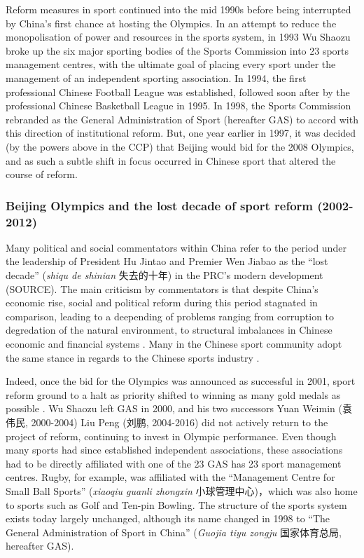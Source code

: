 {Reform measures in sport continued into the mid 1990s before being interrupted by China's first chance at hosting the Olympics.  In an attempt to reduce the monopolisation of power and resources in the sports system, in 1993 Wu Shaozu broke up the six major sporting bodies of the Sports Commission into 23 sports management centres, with the ultimate goal of placing every sport under the management of an independent sporting association.  In 1994, the first professional Chinese Football League was established, followed soon after by the professional Chinese Basketball League in 1995.  In 1998, the Sports Commission rebranded as the General Administration of Sport (hereafter GAS) to accord with this direction of institutional reform.  But, one year earlier in 1997, it was decided (by the powers above in the CCP) that Beijing would bid for the 2008 Olympics, and as such a subtle shift in focus occurred in Chinese sport that altered the course of reform.


\subsubsection{Beijing Olympics and the lost decade of sport reform (2002-2012)}

Many political and social commentators within China refer to the period under the leadership of President Hu Jintao and Premier Wen Jiabao as the ``lost decade'' (\textit{shiqu de shinian} 失去的十年) in the PRC's modern development (SOURCE). The main criticism by commentators is that despite China's economic rise, social and political reform during this period stagnated in comparison, leading to a deepending of problems ranging from corruption to degredation of the natural environment, to structural imbalances in Chinese economic and financial systems \citep{Barme2014}.  Many in the Chinese sport community adopt the same stance in regards to the Chinese sports industry \citep{News2017}.

Indeed, once the bid for the Olympics was announced as successful in 2001, sport reform ground to a halt as priority shifted to winning as many gold medals as possible \citep{News2017}.  Wu Shaozu left GAS in 2000, and his two successors Yuan Weimin (袁伟民, 2000-2004) Liu Peng (刘鹏, 2004-2016) did not actively return to the project of reform, continuing to invest in Olympic performance.  Even though many sports had since established independent associations, these associations had to be directly affiliated with one of the 23 GAS has 23 sport management centres. Rugby, for example, was affiliated with the ``Management Centre for Small Ball Sports'' (\textit{xiaoqiu guanli zhongxin} 小球管理中心)，which was also home to sports such as Golf and Ten-pin Bowling.  The structure of the sports system exists today largely unchanged, although its name changed in 1998 to ``The General Administration of Sport in China'' (\textit{Guojia tiyu zongju} 国家体育总局, hereafter GAS).

}
